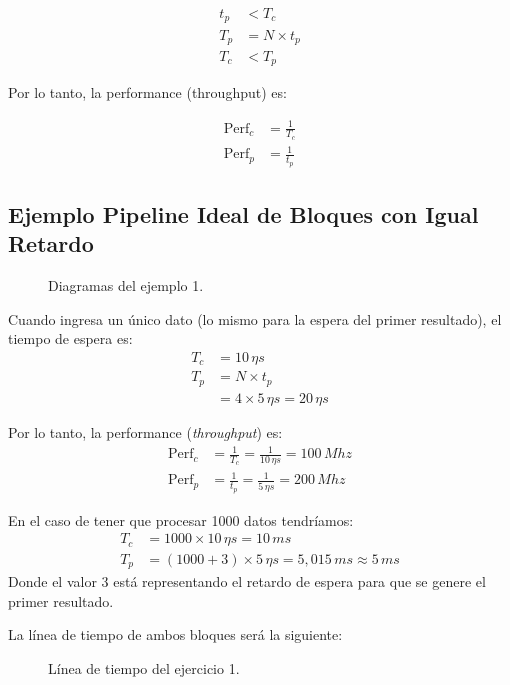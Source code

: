 \documentclass[a4paper, 11pt]{article}
\begin{document}
\begin{align*}
  t_p & <  T_c \\
  T_p &= N \times t_p \\
  T_c & < T_p
\end{align*}

Por lo tanto, la performance (throughput) es:

\begin{align}
  \text{Perf}_c &= \frac{1}{T_c} \\
  \text{Perf}_p &= \frac{1}{t_p}
\end{align}


\newpage
\subsection*{Ejemplo Pipeline Ideal de Bloques con Igual Retardo}


\begin{figure}[h]
  \centering
  \caption{Diagramas del ejemplo 1.}
\end{figure}


Cuando ingresa un único dato (lo mismo para la espera del primer
resultado), el tiempo de espera es:
\begin{align*}
  T_c &= 10\,\eta s \\
  T_p &= N \times t_p \\
      &= 4 \times 5\,\eta s = 20\,\eta s
\end{align*}

Por lo tanto, la performance (\emph{throughput}) es:
\begin{align*}
  \text{Perf}_c &= \frac{1}{T_c} = \frac{1}{10\,\eta s} = 100\,Mhz \\
  \text{Perf}_p &= \frac{1}{t_p} = \frac{1}{5\,\eta s} = 200\,Mhz
\end{align*}


En el caso de tener que procesar 1000 datos tendríamos:
\begin{align*}
  T_c &= 1000 \times 10\,\eta s = 10\,ms \\
  T_p &= (1000 + 3) \times 5\,\eta s = 5,015\,m s \approx 5\,ms
\end{align*}
Donde el valor 3 está representando el retardo de espera para que se
genere el primer resultado.

La línea de tiempo de ambos bloques será la siguiente:
 
\begin{figure}[h]
  \centering
  
  \caption{Línea de tiempo del ejercicio 1.}
\end{figure}
\end{document}
